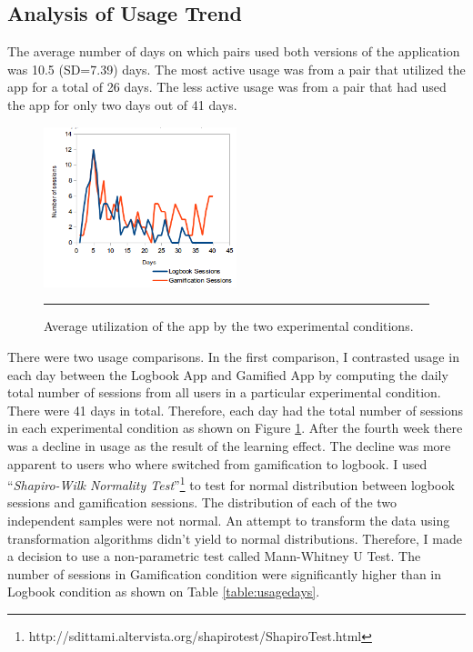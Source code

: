 \subsection{Analysis of Usage Trend}
The average number of days on which pairs used both versions of the application was 10.5 (SD=7.39) days. The most active usage was from a pair that utilized the app for a total of 26 days. The less active usage was from a pair that had used the app for only two days out of 41 days.
\begin{figure}[htbp]
  \centering
    \includegraphics[width=0.5\textwidth]{Figures/scatter_daily_sessions.png}
    \rule{35em}{0.5pt}
  \caption{Average utilization of the app by the two experimental conditions.}
  \label{figure:usagedailysessions}
\end{figure}\newline
There were two usage comparisons. In the first comparison, I contrasted usage in each day between the Logbook App and Gamified App by computing the daily total number of sessions from all users in a particular experimental condition. There were 41 days in total. Therefore, each day had the total number of sessions in each experimental condition as shown on Figure \ref{figure:usagedailysessions}. After the fourth week there was a decline in usage as the result of the learning effect. The decline was more apparent to users who where switched from gamification to logbook. I used ``\emph{Shapiro-Wilk Normality Test}''\footnote{http://sdittami.altervista.org/shapirotest/ShapiroTest.html} to test for normal distribution between logbook sessions and gamification sessions. The distribution of each of the two independent samples were not normal. An attempt to transform the data using transformation algorithms didn't yield to normal distributions. Therefore, I made a decision to use a non-parametric test called Mann-Whitney U Test. The number of sessions in Gamification condition were significantly higher than in Logbook condition as shown on Table \ref{table:usagedays}.
